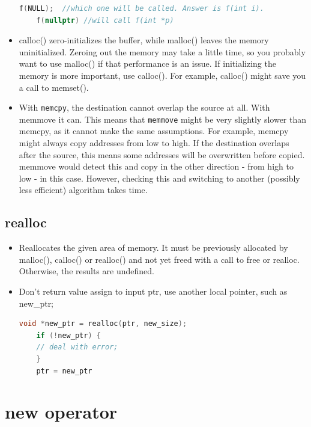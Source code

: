 \documentclass[a4paper,11pt,twoside]{book}
\begin{document}
\begin{itemize}
\begin{lstlisting}[frame=single, language=c++]
	f(NULL);  //which one will be called. Answer is f(int i).
	f(nullptr) //will call f(int *p)
	\end{lstlisting}
	
	\item calloc() zero-initializes the buffer, while malloc() leaves the memory uninitialized. Zeroing out the memory may take a little time, so you probably want to use malloc() if that performance is an issue. If initializing the memory is more important, use calloc(). For example, calloc() might save you a call to memset().
	
	\item With \texttt{memcpy}, the destination cannot overlap the source at all. With memmove it can. This means that \texttt{memmove} might be very slightly slower than memcpy, as it cannot make the same assumptions. For example, memcpy might always copy addresses from low to high. If the destination overlaps after the source, this means some addresses will be overwritten before copied. memmove would detect this and copy in the other direction - from high to low - in this case. However, checking this and switching to another (possibly less efficient) algorithm takes time.
\end{itemize}

\subsection{realloc}
\begin{itemize}
	
	\item Reallocates the given area of memory. It must be previously allocated by malloc(), calloc() or realloc() and not yet freed with a call to free or realloc. Otherwise, the results are undefined.
	
	
	\item Don't return value assign to input ptr, use another local pointer, such as new\_ptr;
	\begin{lstlisting}[frame=single, language=c++]
	void *new_ptr = realloc(ptr, new_size);
	if (!new_ptr) {
	// deal with error;
	}
	ptr = new_ptr
	\end{lstlisting}
\end{itemize}


\section{new operator}
\end{document}
